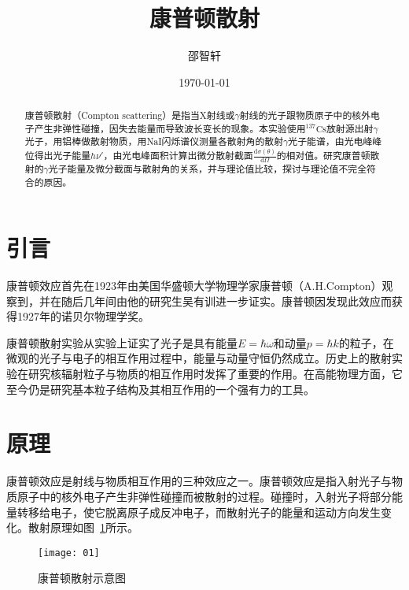 \documentclass[aps,pre,12pt,preprint,onecolumn,showpacs,showkeys]{revtex4-1}
\begin{document}
\title{\bf\heiti{}康普顿散射\vspace{15mm}}
\author{\fangsong{}邵智轩\vspace{2mm}}
\date{\today}

\begin{abstract}
\vspace{10mm}
\begin{spacing}{1.5}
\songti{}
康普顿散射（Compton scattering）是指当X射线或$\gamma$射线的光子跟物质原子中的核外电子产生非弹性碰撞，因失去能量而导致波长变长的现象。本实验使用$^{137}\mathrm{Cs}$放射源出射$\gamma$光子，用铝棒做散射物质，用NaI闪烁谱仪测量各散射角的散射$\gamma$光子能谱，由光电峰峰位得出光子能量$h\nu'$，由光电峰面积计算出微分散射截面$\frac{\mathrm d \sigma(\theta)}{\mathrm d \Omega}$的相对值。研究康普顿散射的$\gamma$光子能量及微分截面与散射角的关系，并与理论值比较，探讨与理论值不完全符合的原因。
\end{spacing}
\end{abstract}
\maketitle
\songti{}

\section{引言}
康普顿效应首先在1923年由美国华盛顿大学物理学家康普顿（A.H.Compton）观察到，并在随后几年间由他的研究生吴有训进一步证实。康普顿因发现此效应而获得1927年的诺贝尔物理学奖。

康普顿散射实验从实验上证实了光子是具有能量$E=\hbar \omega$和动量$p=\hbar k$的粒子，在微观的光子与电子的相互作用过程中，能量与动量守恒仍然成立。历史上的散射实验在研究核辐射粒子与物质的相互作用时发挥了重要的作用。在高能物理方面，它至今仍是研究基本粒子结构及其相互作用的一个强有力的工具。

\section{原理}
康普顿效应是射线与物质相互作用的三种效应之一。康普顿效应是指入射光子与物质原子中的核外电子产生非弹性碰撞而被散射的过程。碰撞时，入射光子将部分能量转移给电子，使它脱离原子成反冲电子，而散射光子的能量和运动方向发生变化。散射原理如图~\ref{fig:fig1}所示。
\begin{figure}[h]
\centering
\texttt{[image: 01]}
\caption{\label{fig:fig1}%
康普顿散射示意图}
\end{figure}
\end{document}
